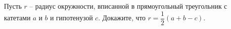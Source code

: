 \begin{ex}
	\begin{condition}
		Пусть \( r \) – радиус окружности, вписанной в прямоугольный треугольник с катетами \( a  \) и \( b \) и гипотенузой \( c \). Докажите, что \( r = \dfrac{1}{2}(a+b-c) \).
	\end{condition}
\end{ex}
